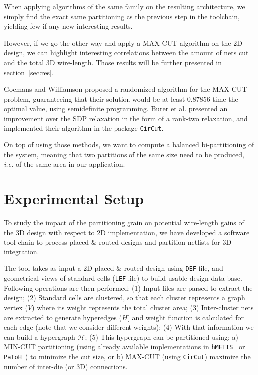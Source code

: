 \documentclass[conference]{IEEEtran}
\begin{document}
When applying algorithms of the same family on the resulting architecture, we simply find the exact same partitioning as the previous step in the toolchain, yielding few if any new interesting results.

However, if we go the other way and apply a MAX-CUT algorithm on the 2D design, we can highlight interesting correlations between the amount of nets cut and the total 3D wire-length.
Those results will be further presented in section~\ref{sec:res}.


Goemans and Williamson \cite{Goemans1995} proposed a randomized algorithm for the MAX-CUT problem, guaranteeing that their solution would be at least 0.87856 time the optimal value, using semidefinite programming. Burer et al. \cite{Burer2000} presented an improvement over the SDP relaxation in the form of a rank-two relaxation, and implemented their algorithm in the package \texttt{CirCut}.

On top of using those methods, we want to compute a balanced bi-partitioning of the system, meaning that two partitions of the same size need to be produced, \textit{i.e.} of the same area in our application.

\section{Experimental Setup}
To study the impact of the partitioning grain on potential wire-length gains of the 3D design with respect to 2D implementation, we have developed a software tool chain to process placed \& routed designs and partition netlists for 3D integration. 

The tool takes as input a 2D placed \& routed design using \texttt{DEF} file, and geometrical views of standard cells (\texttt{LEF} file) to build usable design data base. Following operations are then performed: (1) Input files are parsed to extract the design; (2) Standard cells are clustered, so that each cluster represents a graph vertex ($V$) where its weight represents the total cluster area; (3) Inter-cluster nets are extracted to generate hyperedges ($H$) and weight function is calculated for each edge (note that we consider different weights); (4) With that information we can build a hypergraph $\mathcal{H}$; (5) This hypergraph can be partitioned using: a) MIN-CUT partitioning (using already available implementations in \texttt{hMETIS}~\cite{Karypis1999} or \texttt{PaToH}~\cite{Aykanat2011}) to minimize the cut size, or b) MAX-CUT (using \texttt{CirCut}) maximize the number of inter-die (or 3D) connections.
\end{document}
